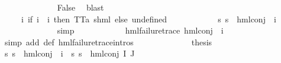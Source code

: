 \begin{isabellebody}
\ \ \ \ \ \ \ \ \ \ \ \ \isamarkupfalse%
\ False\ \isamarkupfalse%
\ blast\isanewline
\ \ \ \ \ \ \ \ \ \ \isamarkupfalse%
\ {\isasymPsi}\ \ {\isachardoublequoteopen}{\isasymPsi}\ {\isasymequiv}\ {\isacharparenleft}{\kern0pt}{\isasymlambda}i{\isachardot}{\kern0pt}\ {\isacharparenleft}{\kern0pt}if\ i\ {\isacharequal}{\kern0pt}\ i{\isacharunderscore}{\kern0pt}{\isasymphi}\ then\ TT{\isacharcolon}{\kern0pt}{\isacharcolon}{\kern0pt}{\isacharparenleft}{\kern0pt}{\isacharprime}{\kern0pt}a{\isacharcomma}{\kern0pt}\ {\isacharprime}{\kern0pt}s{\isacharparenright}{\kern0pt}hml\ else\ undefined{\isacharparenright}{\kern0pt}{\isacharparenright}{\kern0pt}{\isachardoublequoteclose}\isanewline
\ \ \ \ \ \ \ \ \ \ \isamarkupfalse%
\ {\isachardoublequoteopen}{\isasymforall}s{\isachardot}{\kern0pt}\ {\isasymnot}{\isacharparenleft}{\kern0pt}s\ {\isasymTurnstile}\ hml{\isacharunderscore}{\kern0pt}conj\ {\isacharbraceleft}{\kern0pt}{\isacharbraceright}{\kern0pt}\ {\isacharbraceleft}{\kern0pt}i{\isacharunderscore}{\kern0pt}{\isasymphi}{\isacharbraceright}{\kern0pt}\ {\isasymPsi}{\isacharparenright}{\kern0pt}{\isachardoublequoteclose}\ \isanewline
\ \ \ \ \ \ \ \ \ \ \ \ \isamarkupfalse%
\ simp\isanewline
\ \ \ \ \ \ \ \ \ \ \isamarkupfalse%
\ {\isachardoublequoteopen}hml{\isacharunderscore}{\kern0pt}failure{\isacharunderscore}{\kern0pt}trace\ {\isacharparenleft}{\kern0pt}hml{\isacharunderscore}{\kern0pt}conj\ {\isacharbraceleft}{\kern0pt}{\isacharbraceright}{\kern0pt}\ {\isacharbraceleft}{\kern0pt}i{\isacharunderscore}{\kern0pt}{\isasymphi}{\isacharbraceright}{\kern0pt}\ {\isasymPsi}{\isacharparenright}{\kern0pt}{\isachardoublequoteclose}\ \isanewline
\ \ \ \ \ \ \ \ \ \ \ \ \isamarkupfalse%
\ {\isacharparenleft}{\kern0pt}simp\ add{\isacharcolon}{\kern0pt}\ {\isasymPsi}{\isacharunderscore}{\kern0pt}def\ hml{\isacharunderscore}{\kern0pt}failure{\isacharunderscore}{\kern0pt}trace{\isachardot}{\kern0pt}intros{\isacharparenleft}{\kern0pt}{}{\isacharparenright}{\kern0pt}{\isacharparenright}{\kern0pt}\isanewline
\ \ \ \ \ \ \ \ \ \ \isamarkupfalse%
\ \isamarkupfalse%
\ {\isacharquery}{\kern0pt}thesis\ \isamarkupfalse%
\ {\isacartoucheopen}{\isasymforall}s{\isachardot}{\kern0pt}\ {\isasymnot}{\isacharparenleft}{\kern0pt}s\ {\isasymTurnstile}\ hml{\isacharunderscore}{\kern0pt}conj\ {\isacharbraceleft}{\kern0pt}{\isacharbraceright}{\kern0pt}\ {\isacharbraceleft}{\kern0pt}i{\isacharunderscore}{\kern0pt}{\isasymphi}{\isacharbraceright}{\kern0pt}\ {\isasymPsi}{\isacharparenright}{\kern0pt}{\isacartoucheclose}\ {\isacartoucheopen}{\isasymforall}s{\isachardot}{\kern0pt}\ {\isasymnot}{\isacharparenleft}{\kern0pt}s\ {\isasymTurnstile}\ hml{\isacharunderscore}{\kern0pt}conj\ I\ J\ {\isasymPhi}{\isacharparenright}{\kern0pt}{\isacartoucheclose}\ \isanewline

\end{isabellebody}
